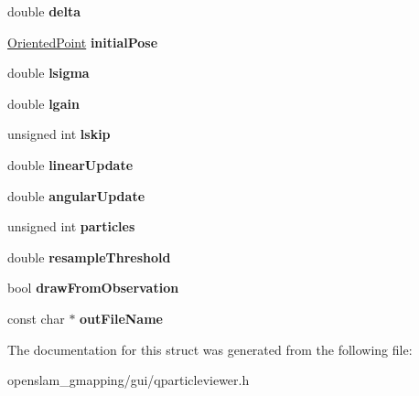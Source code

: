 \begin{DoxyCompactItemize}
double {\bfseries delta}
\item 
\mbox{\label{structGMapping_1_1QParticleViewer_1_1StartParameters_a9e97461e52cbfacced45a155b2645024}} 
\hyperlink{structGMapping_1_1orientedpoint}{Oriented\+Point} {\bfseries initial\+Pose}
\item 
\mbox{\label{structGMapping_1_1QParticleViewer_1_1StartParameters_af1a95fbbcba453bca0fb368bd176dbf6}} 
double {\bfseries lsigma}
\item 
\mbox{\label{structGMapping_1_1QParticleViewer_1_1StartParameters_a1f0cb95b49e55112340d7bede2191671}} 
double {\bfseries lgain}
\item 
\mbox{\label{structGMapping_1_1QParticleViewer_1_1StartParameters_a87ef0b6b79796f4b0dc0f0329c5aae72}} 
unsigned int {\bfseries lskip}
\item 
\mbox{\label{structGMapping_1_1QParticleViewer_1_1StartParameters_ace2814ed690a1c4126ba3b473c356360}} 
double {\bfseries linear\+Update}
\item 
\mbox{\label{structGMapping_1_1QParticleViewer_1_1StartParameters_a38ae396871f750922c81703b08c710b4}} 
double {\bfseries angular\+Update}
\item 
\mbox{\label{structGMapping_1_1QParticleViewer_1_1StartParameters_a72b685157c175b7f6637a32e2f23e009}} 
unsigned int {\bfseries particles}
\item 
\mbox{\label{structGMapping_1_1QParticleViewer_1_1StartParameters_a31ce2c9fef7cf20ddf9356df4190d235}} 
double {\bfseries resample\+Threshold}
\item 
\mbox{\label{structGMapping_1_1QParticleViewer_1_1StartParameters_ae0b3efa4fa1c5e20a4dc05df8d657d9f}} 
bool {\bfseries draw\+From\+Observation}
\item 
\mbox{\label{structGMapping_1_1QParticleViewer_1_1StartParameters_a3cabcf41fd83346f60656fbc1934748d}} 
const char $\ast$ {\bfseries out\+File\+Name}
\end{DoxyCompactItemize}


The documentation for this struct was generated from the following file\+:\begin{DoxyCompactItemize}
\item 
openslam\+\_\+gmapping/gui/qparticleviewer.\+h\end{DoxyCompactItemize}
